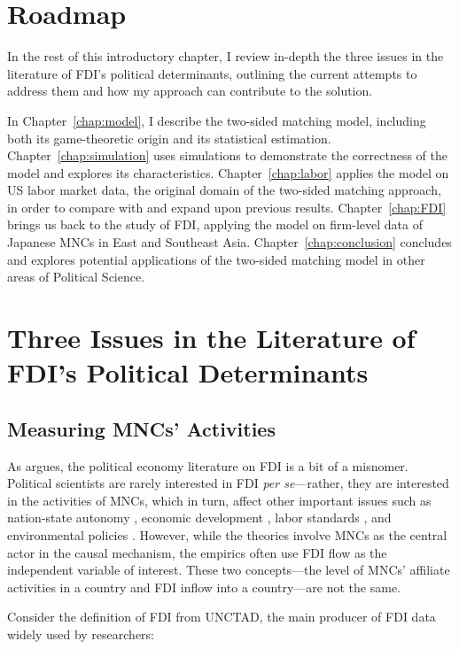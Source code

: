 \section{Roadmap}

In the rest of this introductory chapter, I review in-depth the three issues in
the literature of FDI's political determinants, outlining the current attempts
to address them and how my approach can contribute to the solution.

In Chapter~\ref{chap:model}, I describe the two-sided matching model, including
both its game-theoretic origin and its statistical estimation.
Chapter~\ref{chap:simulation} uses simulations to demonstrate the correctness of
the model and explores its characteristics. Chapter~\ref{chap:labor} applies the
model on US labor market data, the original domain of the two-sided matching
approach, in order to compare with and expand upon previous results.
Chapter~\ref{chap:FDI} brings us back to the study of FDI, applying the model on
firm-level data of Japanese MNCs in East and Southeast Asia.
Chapter~\ref{chap:conclusion} concludes and explores potential applications of
the two-sided matching model in other areas of Political Science.

\section{Three Issues in the Literature of FDI's Political Determinants}
\label{sec:literature_issues}

\subsection{Measuring MNCs' Activities}

As \citet{Kerner2014} argues, the political economy literature on FDI is a bit
of a misnomer. Political scientists are rarely interested in FDI \textit{per
se}---rather, they are interested in the activities of MNCs, which in turn,
affect other important issues such as nation-state autonomy \citep{Mosley2005},
economic development \citep{Moran1998}, labor standards \citep{Mosley2007}, and
environmental policies \citep{Prakash2007}. However, while the theories involve
MNCs as the central actor in the causal mechanism, the empirics often use FDI
flow as the independent variable of interest. These two concepts---the level of
MNCs' affiliate activities in a country and FDI inflow into a country---are not
the same.

Consider the definition of FDI from UNCTAD, the main producer of FDI data widely
used by researchers:

